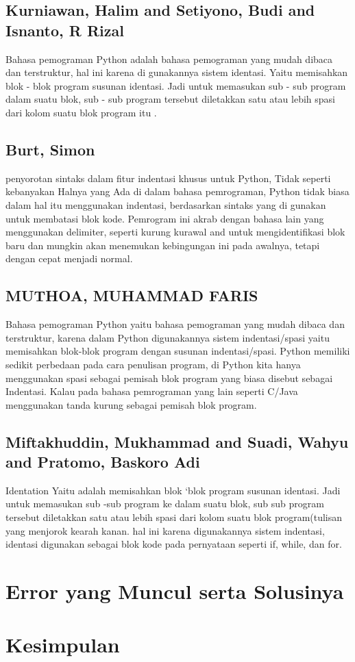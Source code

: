 \documentclass[12pt]{article}
\begin{document}
\subsection{Kurniawan, Halim and Setiyono, Budi and Isnanto, R Rizal}
Bahasa pemograman Python adalah bahasa pemograman yang mudah dibaca dan terstruktur, hal ini karena di gunakannya sistem identasi. Yaitu memisahkan blok - blok program susunan identasi. Jadi untuk memasukan sub - sub program dalam suatu blok, sub - sub program tersebut diletakkan satu atau lebih spasi dari kolom suatu blok program itu \cite{kurniawan2011aplikasi}.

\subsection{Burt, Simon}
penyorotan sintaks dalam fitur indentasi khusus untuk Python, Tidak seperti kebanyakan Halnya yang Ada di dalam bahasa pemrograman, Python tidak biasa dalam hal itu menggunakan indentasi, berdasarkan sintaks yang di gunakan untuk membatasi blok kode. Pemrogram ini akrab dengan bahasa lain yang menggunakan delimiter, seperti kurung kurawal {and} untuk mengidentifikasi blok baru dan mungkin akan menemukan kebingungan ini pada awalnya, tetapi dengan cepat menjadi normal\cite{burtusing}.

\subsection{MUTHOA, MUHAMMAD FARIS}
Bahasa pemograman Python yaitu bahasa pemograman yang mudah dibaca dan terstruktur, karena dalam Python digunakannya sistem indentasi/spasi yaitu memisahkan blok-blok program dengan susunan indentasi/spasi. Python memiliki sedikit perbedaan pada cara penulisan program, di Python kita hanya menggunakan spasi sebagai pemisah blok program yang biasa disebut sebagai Indentasi. Kalau pada bahasa pemrograman yang lain seperti C/Java menggunakan tanda kurung sebagai pemisah blok program\cite{muthoa2017sistem}.

\subsection{Miftakhuddin, Mukhammad and Suadi, Wahyu and Pratomo, Baskoro Adi}
Identation Yaitu adalah memisahkan blok `blok program susunan identasi. Jadi untuk memasukan sub -sub program ke dalam suatu blok, sub sub program tersebut diletakkan satu atau lebih spasi dari kolom suatu blok program(tulisan yang menjorok kearah kanan. hal ini karena digunakannya sistem indentasi, identasi digunakan sebagai blok kode pada pernyataan seperti if, while, dan for\cite{miftakhuddinimplementasi}. 


\section{Error yang Muncul serta Solusinya}


\section{Kesimpulan}
\end{document}
